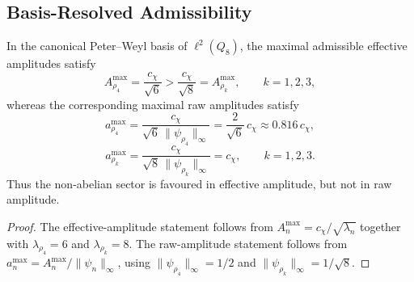 \subsection{Basis-Resolved Admissibility}
  \label{subsec:basis-resolved-admissibility}

  \begin{proposition}
    \label{prop:basis-resolved}
    In the canonical Peter--Weyl basis of $\ell^2(Q_8)$, the maximal admissible
    effective amplitudes satisfy
    \begin{equation}
      A_{\rho_4}^{\max}
      =
      \frac{c_\chi}{\sqrt{6}}
      >
      \frac{c_\chi}{\sqrt{8}}
      =
      A_{\rho_k}^{\max},
      \qquad
      k=1,2,3,
    \end{equation}
    whereas the corresponding maximal raw amplitudes satisfy
    \begin{equation}
      a_{\rho_4}^{\max}
      =
      \frac{c_\chi}{\sqrt{6}\,\|\psi_{\rho_4}\|_\infty}
      =
      \frac{2}{\sqrt{6}}\,c_\chi
      \approx 0.816\,c_\chi,
    \end{equation}
    \begin{equation}
      a_{\rho_k}^{\max}
      =
      \frac{c_\chi}{\sqrt{8}\,\|\psi_{\rho_k}\|_\infty}
      =
      c_\chi,
      \qquad
      k=1,2,3.
    \end{equation}
    Thus the non-abelian sector is favoured in effective amplitude, but not in raw
    amplitude.
  \end{proposition}

  \begin{proof}
    The effective-amplitude statement follows from
    $A_n^{\max} = c_\chi/\sqrt{\lambda_n}$ together with
    $\lambda_{\rho_4} = 6$ and $\lambda_{\rho_k} = 8$.
    The raw-amplitude statement follows from
    $a_n^{\max} = A_n^{\max}/\|\psi_n\|_\infty$, using
    $\|\psi_{\rho_4}\|_\infty = 1/2$ and
    $\|\psi_{\rho_k}\|_\infty = 1/\sqrt{8}$.
  \end{proof}
